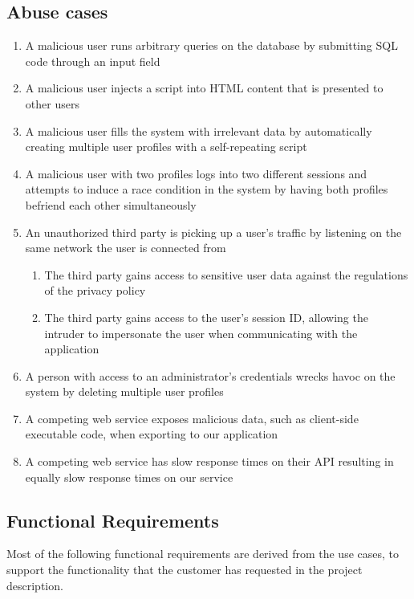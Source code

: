 \documentclass[a4paper]{article}
\begin{document}
\subsection{Abuse cases}
\begin{enumerate}
\item A malicious user runs arbitrary queries on the database by submitting SQL code through an input field
\item A malicious user injects a script into HTML content that is presented to other users
\item A malicious user fills the system with irrelevant data by automatically creating multiple user profiles with a self-repeating script
\item A malicious user with two profiles logs into two different sessions and attempts to induce a race condition in the system by having both profiles befriend each other simultaneously
\item An unauthorized third party is picking up a user's traffic by listening on the same network the user is connected from
	\begin{enumerate}
		\item The third party gains access to sensitive user data against the regulations of the privacy policy
		\item The third party gains access to the user's session ID, allowing the intruder to impersonate the user when communicating with the application
	\end{enumerate}
\item A person with access to an administrator's credentials wrecks havoc on the system by deleting multiple user profiles
\item A competing web service exposes malicious data, such as client-side executable code, when exporting to our application
\item A competing web service has slow response times on their API resulting in equally slow response times on our service
\end{enumerate}

\subsection{Functional Requirements}
Most of the following functional requirements are derived from the use cases, to support the functionality that the customer has requested in the project description. 
\end{document}
